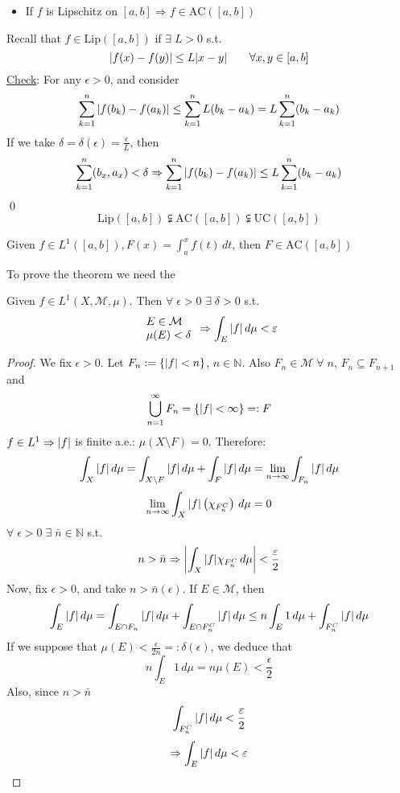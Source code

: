 \begin{itemize}
    \item If \(f\) is Lipschitz on \([a,b] \Rightarrow f \in \text{AC}([a,b])\) 
\end{itemize}
Recall that \(f \in \mbox{Lip}([a,b])\) if \(\exists \; L > 0\) s.t. 
\[
    \abs{f(x) - f(y)} \leq L\abs{x-y} \qquad \forall x, y \in \left[a, b\right]
\]
\noindent\underline{Check}: For any \(\epsilon > 0\), and consider 
\[
    \sum_{k=1}^n \abs{f(b_k)-f(a_k)} \leq \sum_{k=1}^n L(b_k-a_k) = L \sum_{k=1}^n (b_k-a_k)
\]
If we take \(\delta = \delta(\epsilon) = \frac{\epsilon}{L}\), then 
\[
    \sum_{k=1}^n (b_x, a_x) < \delta \Rightarrow \sum_{k=1}^n \abs{f(b_k)-f(a_k) } \leq L \sum_{k=1}^n (b_k-a_k)
\]
\qed
\[
    \mbox{Lip}([a,b]) \subsetneqq \mbox{AC}([a,b]) \subsetneqq \mbox{UC}([a,b])
\]
\begin{theorem}
    Given \(f \in L^1([a,b]), F(x) = \int_a^xf(t) \, dt\), then \(F \in \mbox{AC}([a,b])\)
\end{theorem}
To prove the theorem we need the
\begin{theorem}
    Given \(f \in L^1(X, \mathcal{M}, \mu)\). Then \(\forall \; \epsilon >0 \) \(\exists \; \delta > 0\) s.t.     
    \[
        \begin{array}{l}
            E \in \mathcal{M} \\
            \mu(E) < \delta
        \end{array} 
        \Rightarrow \int_E \abs{f} \, d\mu < \varepsilon
    \]
\end{theorem}
\begin{proof}
    We fix \(\epsilon > 0\). Let \(F_n := \left\{ \abs{f} < n \right\}\), \(n \in \mathbb{N}\). Also \(F_n \in \mathcal{M}\; \forall \; n\), \(F_n \subseteq F_{n+1}\) and 
    \[
        \bigcup_{n=1}^{\infty} F_n = \left\{ \abs{f} < \infty \right\} =: F
    \]
    \(f \in L^1 \Rightarrow \abs{f}\) is finite a.e.: \(\mu(X \setminus F) =0\).
    Therefore:
    \[
        \int_X \abs{f} \, d\mu = \int_{X \setminus F} \abs{f} \, d\mu + \int_F \abs{f} \, d\mu 
        = \lim_{n \to\infty} \int_{F_n} \abs{f} \, d\mu
    \]
    \[
        \lim_{n\to\infty} \int_X \abs{f} \left( \chi_{F_n^C} \right) \, d\mu =0
    \]
    \(\forall \; \epsilon >0 \; \exists \; \bar{n} \in \mathbb{N}\) s.t. 
    \[
        n > \bar{n} \Rightarrow \abs{\int_X \abs{f} \chi_{F_n^C} \, d\mu} < \frac{\varepsilon}{2}
    \]
    Now, fix \(\epsilon >0 \), and take \(n > \bar{n}(\epsilon)\). If \(E \in \mathcal{M}\), then
    \[
        \int_E \abs{f} \, d\mu = \int_{E \cap F_n} \abs{f} \, d\mu + \int_{E \cap F_n^C} \abs{f} \, d\mu
        \leq n \int_E 1 \, d\mu + \int_{F_n^C} \abs{f} \, d\mu 
    \]
    If we suppose that \(\mu(E) < \frac{\epsilon}{2n} =: \delta(\epsilon)\), we deduce that
    \[
        n \int_E 1 \, d\mu = n \mu(E) < \frac{\epsilon}{2}
    \]
    Also, since \(n > \bar{n}\)
    \[
        \int_{F_n^C} \abs{f} \, d\mu < \frac{\varepsilon}{2}
    \]
    \[
        \Rightarrow \int_E \abs{f} \, d\mu < \varepsilon \]
\end{proof}
